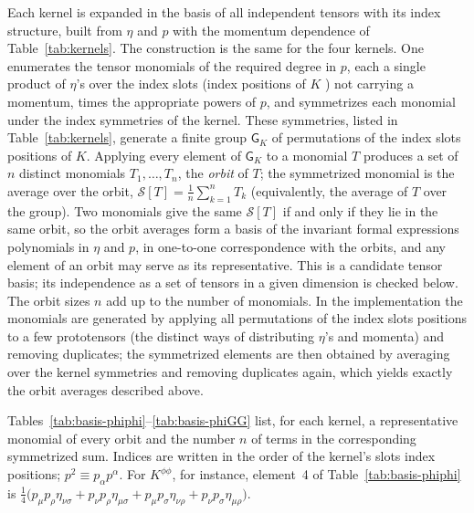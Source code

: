 \documentclass[prd,aps,preprint,superscriptaddress,nofootinbib,amsmath,amssymb,eqsecnum]{revtex4-2}
\providecommand{\DIFaddtex}[1]{{\protect\color{blue} \sf #1}} %
\providecommand{\DIFdeltex}[1]{{\protect\color{red} \scriptsize #1}} %
\providecommand{\DIFaddbegin}{} %
\providecommand{\DIFaddend}{} %
\providecommand{\DIFdelbegin}{} %
\providecommand{\DIFdelend}{} %
\providecommand{\DIFadd}[1]{\texorpdfstring{\DIFaddtex{#1}}{#1}} %
\providecommand{\DIFdel}[1]{\texorpdfstring{\DIFdeltex{#1}}{}} %
\begin{document}
Each kernel is expanded in the basis of all independent tensors with its index structure,
built from $\eta$ and $p$ with the momentum dependence of Table~\ref{tab:kernels}. The
construction is the same for the four kernels. One enumerates the tensor monomials of the
required degree in $p$, each a single product of $\eta$'s over the index
\DIFdelbegin \DIFdel{slots (index
}\DIFdelend positions of $K$ \DIFdelbegin \DIFdel{) }\DIFdelend not carrying a
momentum, times the appropriate powers of $p$, and symmetrizes each monomial under the
index symmetries of the kernel. These symmetries, listed in Table~\ref{tab:kernels}, generate
a finite group $\mathsf{G}_K$ of permutations of the index \DIFdelbegin \DIFdel{slots }\DIFdelend \DIFaddbegin \DIFadd{positions }\DIFaddend of $K$. Applying every
element of $\mathsf{G}_K$ to a monomial $T$ produces a set of $n$ distinct monomials
$T_1,\dots,T_n$, the \emph{orbit} of $T$; the symmetrized monomial is the average over the
orbit, $\mathcal{S}[T]=\frac{1}{n}\sum_{k=1}^{n}T_k$ (equivalently, the average of $T$ over the
group). Two monomials give the same $\mathcal{S}[T]$ if and only if they lie in the same
orbit, so the orbit averages form a basis of the invariant \DIFdelbegin \DIFdel{formal expressions}\DIFdelend \DIFaddbegin \DIFadd{polynomials in $\eta$ and $p$}\DIFaddend , in
one-to-one correspondence with the orbits, and any element of an orbit may serve as its
representative. This is a candidate tensor basis; its independence as a set of tensors in a
given dimension is checked below. The orbit sizes $n$ add up to the number of monomials. In
the implementation the monomials are generated by applying all permutations of the index
\DIFdelbegin \DIFdel{slots }\DIFdelend \DIFaddbegin \DIFadd{positions }\DIFaddend to a few prototensors (the distinct ways of distributing $\eta$'s and momenta) and
removing duplicates; the symmetrized elements are then obtained by averaging over the
kernel symmetries and removing duplicates again, which yields exactly the orbit averages
described above.

Tables~\ref{tab:basis-phiphi}--\ref{tab:basis-phiGG} list, for each kernel, a representative
monomial of every orbit and the number $n$ of terms in the corresponding symmetrized sum.
Indices are written in the order of the kernel's \DIFdelbegin \DIFdel{slots}\DIFdelend \DIFaddbegin \DIFadd{index positions}\DIFaddend ; $p^2\equiv p_\alpha p^\alpha$. For
$K^{\phi\phi}$, for instance, element~4 of Table~\ref{tab:basis-phiphi} is
$\tfrac14\big(p_\mu p_\rho\eta_{\nu\sigma}+p_\nu p_\rho\eta_{\mu\sigma}
+p_\mu p_\sigma\eta_{\nu\rho}+p_\nu p_\sigma\eta_{\mu\rho}\big)$.
\end{document}
